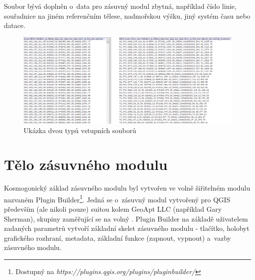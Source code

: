 Soubor bývá doplněn o~data pro zásuvný modul zbytná, například číslo linie, souřadnice na jiném
referenčním tělese, nadmořskou výšku, jiný systém času nebo datace. 

  \begin{figure}[H]
   \centering
	\includegraphics[scale=0.45]{./pictures/ukazka-vstup.png}
	\caption[Ukázka dvou typů vstupních souborů]{Ukázka dvou typů vstupních souborů
      \label{fig:ukazka-vstup}}
  \end{figure}

\section{Tělo zásuvného modulu}
\label{telo}

Kosmogonický základ zásuvného modulu byl vytvořen ve volně šiřitelném mo\-dulu nazvaném Plugin
Builder\footnote{Dostupný na \textit{https://plugins.qgis.org/plugins/pluginbuilder/}}. Jedná se
o~zásuvný modul vytvořený pro QGIS především (ale nikoli pouze) suitou kolem GeoApt LLC (například Gary
Sherman), skupi\-ny zaměřující se na volný . Plugin Builder na
základě uživatelem zadaných parametrů vytvoří základní skelet zásuvného modulu - tlačítko, holobyt
grafického rozhraní, metadata, základní funkce (zapnout, vypnout) a~vazby zásuvného modulu. 

